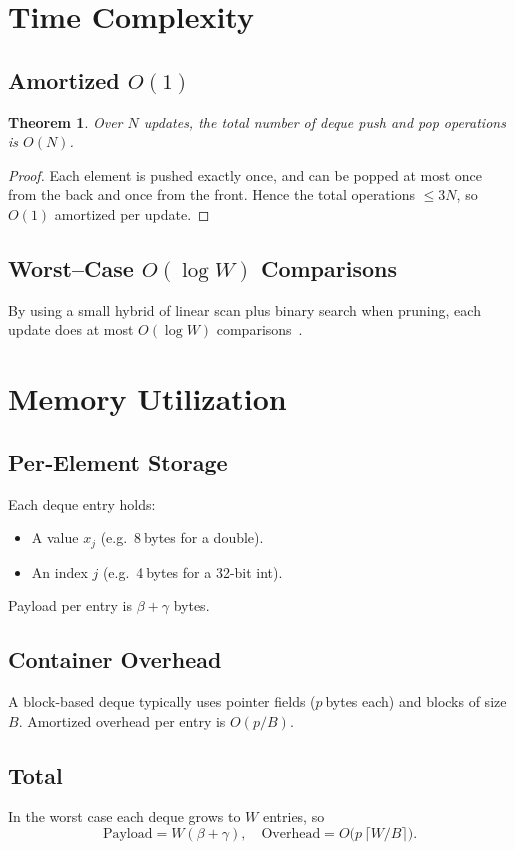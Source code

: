 \documentclass[12pt,letterpaper]{article}
\newtheorem{theorem}{Theorem}
\begin{document}
\section{Time Complexity}
\subsection{Amortized \(O(1)\)}
\begin{theorem}
Over \(N\) updates, the total number of deque push and pop operations is \(O(N)\).
\end{theorem}
\begin{proof}
Each element is pushed exactly once, and can be popped at most once from the back and once from the front.  Hence the total operations \(\le3N\), so \(O(1)\) amortized per update.
\end{proof}

\subsection{Worst–Case \(O(\log W)\) Comparisons}
By using a small hybrid of linear scan plus binary search when pruning, each update does at most \(O(\log W)\) comparisons~\cite{Lemire2006}.

\section{Memory Utilization}
\subsection{Per‐Element Storage}
Each deque entry holds:
\begin{itemize}
  \item A value \(x_j\) (e.g.\ 8 bytes for a double).
  \item An index \(j\) (e.g.\ 4 bytes for a 32-bit int).
\end{itemize}
Payload per entry is \(\beta+\gamma\) bytes.

\subsection{Container Overhead}
A block-based deque typically uses pointer fields (\(p\) bytes each) and blocks of size \(B\).  Amortized overhead per entry is \(O(p/B)\).

\subsection{Total}
In the worst case each deque grows to \(W\) entries, so  
\[
  \text{Payload} = W(\beta+\gamma),\quad
  \text{Overhead} = O\bigl(p\,\lceil W/B\rceil\bigr).
\]
\end{document}
